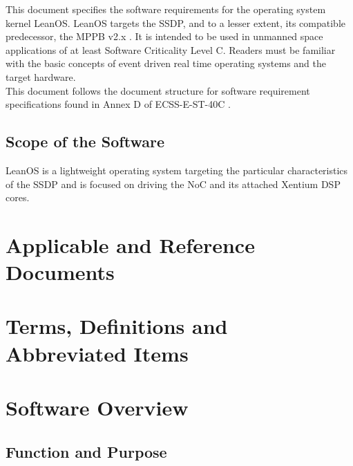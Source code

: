 This document specifies the software requirements for the operating system
kernel LeanOS. LeanOS targets the \gls{SSDP}, and to a lesser extent, its
compatible predecessor, the \gls{MPPB} v2.x \cite{MPPB}.
It is intended to be used in unmanned space applications of at least
Software Criticality Level C. Readers must be familiar with the basic concepts
of event driven real time operating systems and the target hardware. \\

\noindent
This document follows the document structure for software requirement
specifications found in Annex D of ECSS-E-ST-40C \cite{ECSS40C}.

\section{Scope of the Software}

LeanOS is a lightweight operating system targeting the particular
characteristics of the \gls{SSDP} and is focused on driving the \gls{NoC} and
its attached \gls{Xentium} \gls{DSP} cores.

\chapter{Applicable and Reference Documents} %

\printbibliography[heading=none]


\chapter{Terms, Definitions and Abbreviated Items}
\printglossary[type=acronym]
\printglossary[type=main, style=altlist]



\chapter{Software Overview}

\section{Function and Purpose}

